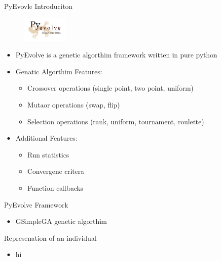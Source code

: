 \begin{frame}{PyEvovle Introduciton}
  \begin{figure}
    \centering
    \includegraphics[width=0.2\textwidth]{PyEvolveLogo.png}
  \end{figure}
  \begin{itemize}
  \small
  \item PyEvolve is a genetic algorthim framework written in pure python
  \item Genatic Algorthim Features:
    \begin{itemize}
      \tiny
      \item Crossover operations (single point, two point, uniform)
      \item Mutaor operations (swap, flip)
      \item Selection operations (rank, uniform, tournament, roulette)
    \end{itemize}
  \small
  \item Additional Features:
    \begin{itemize}
      \tiny
      \item Run statistics
      \item Convergene critera
      \item Function callbacks
    \end{itemize}
  \end{itemize}
\end{frame}
\begin{frame}{PyEvolve Framework}
  \begin{itemize}
    \item GSimpleGA genetic algorthim
  \end{itemize}
  Represenation of an individual
  \begin{itemize}
    \item hi
  \end{itemize}
\end{frame}
